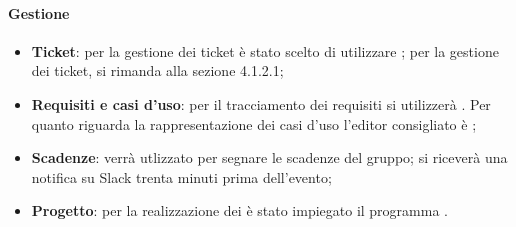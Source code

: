 	\paragraph{Gestione}
	\begin{itemize}
		\item \textbf{Ticket}: per la gestione dei ticket è stato scelto di utilizzare ; per la gestione dei ticket, si rimanda alla sezione 4.1.2.1;
		\item \textbf{Requisiti e casi d'uso}: per il tracciamento dei requisiti si utilizzerà . Per quanto riguarda la rappresentazione dei casi d'uso l'editor consigliato è ; %
		\item \textbf{Scadenze}:  verrà utlizzato per segnare le scadenze del gruppo; si riceverà una notifica su Slack trenta minuti prima dell'evento;
		\item \textbf{Progetto}: per la realizzazione dei  è stato impiegato il programma .
	\end{itemize}
